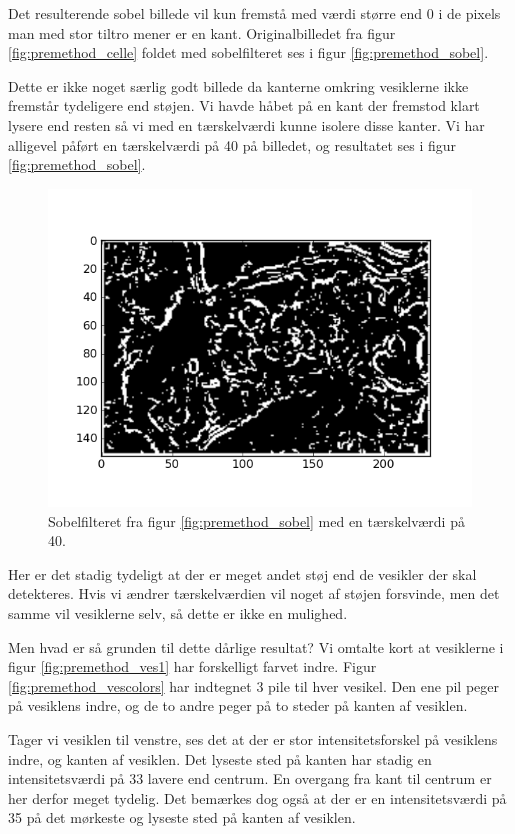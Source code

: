 Det resulterende sobel billede vil kun fremstå med værdi større end 0 i de pixels man med stor tiltro mener er en kant. Originalbilledet fra figur \ref{fig:premethod_celle} foldet med sobelfilteret ses i figur \ref{fig:premethod_sobel}. 

Dette er ikke noget særlig godt billede da kanterne omkring vesiklerne ikke fremstår tydeligere end støjen. Vi havde håbet på en kant der fremstod klart lysere end resten så vi med en tærskelværdi kunne isolere disse kanter. Vi har alligevel påført en tærskelværdi på 40 på billedet, og resultatet ses i figur \ref{fig:premethod_sobel}.

\begin{figure}[H]
	\centering
	\includegraphics[scale=0.8]{files/premethod/img/edgemap.png}
	\caption{Sobelfilteret fra figur \ref{fig:premethod_sobel} med en tærskelværdi på 40.\label{fig:premethod_edgemap}}
\end{figure}

Her er det stadig tydeligt at der er meget andet støj end de vesikler der skal detekteres. Hvis vi ændrer tærskelværdien vil noget af støjen forsvinde, men det samme vil vesiklerne selv, så dette er ikke en mulighed.

Men hvad er så grunden til dette dårlige resultat? Vi omtalte kort at vesiklerne i figur \ref{fig:premethod_ves1} har forskelligt farvet indre. Figur \ref{fig:premethod_vescolors} har indtegnet 3 pile til hver vesikel. Den ene pil peger på vesiklens indre, og de to andre peger på to steder på kanten af vesiklen. 

Tager vi vesiklen til venstre, ses det at der er stor intensitetsforskel på vesiklens indre, og kanten af vesiklen. Det lyseste sted på kanten har stadig en intensitetsværdi på 33 lavere end centrum. En overgang fra kant til centrum er her derfor meget tydelig. Det bemærkes dog også at der er en intensitetsværdi på 35 på det mørkeste og lyseste sted på kanten af vesiklen. 

